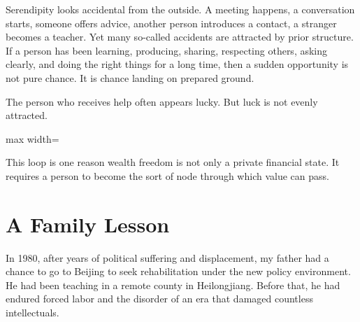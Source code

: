 Serendipity looks accidental from the outside. A meeting happens, a conversation starts, someone offers advice, another person introduces a contact, a stranger becomes a teacher. Yet many so-called accidents are attracted by prior structure. If a person has been learning, producing, sharing, respecting others, asking clearly, and doing the right things for a long time, then a sudden opportunity is not pure chance. It is chance landing on prepared ground.

The person who receives help often appears lucky. But luck is not evenly attracted.

\begin{center}
\begin{adjustbox}{max width=\linewidth}
\end{adjustbox}
\end{center}

This loop is one reason wealth freedom is not only a private financial state. It requires a person to become the sort of node through which value can pass.

\section*{A Family Lesson}

In 1980, after years of political suffering and displacement, my father had a chance to go to Beijing to seek rehabilitation under the new policy environment. He had been teaching in a remote county in Heilongjiang. Before that, he had endured forced labor and the disorder of an era that damaged countless intellectuals.

